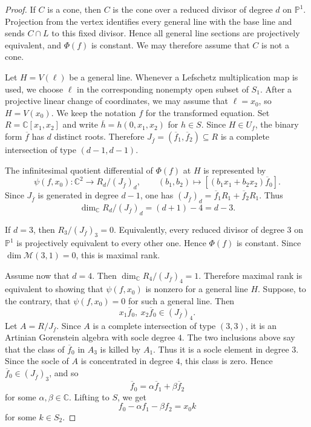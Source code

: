 \documentclass[11pt]{amsart}
\theoremstyle{plain}
\theoremstyle{definition}
\numberwithin{equation}{section}
\newcommand{\M}{{\mathcal M}}
\newcommand{\C}{\mathbb{C}}
\newcommand{\PP}{\mathbb{P}}
\begin{document}
\begin{proof}
If $C$ is a cone, then $C$ is the cone over a reduced divisor of degree $d$ on
$\PP^1$. Projection from the vertex identifies every general line with the base
line and sends $C\cap L$ to this fixed divisor. Hence all general line sections
are projectively equivalent, and $\Phi(f)$ is constant. We may therefore assume
that $C$ is not a cone.

Let $H=V(\ell)$ be a general line. Whenever a Lefschetz multiplication map is
used, we choose $\ell$ in the corresponding nonempty open subset of $S_1$. After
a projective linear change of coordinates, we may assume that $\ell=x_0$, so
$H=V(x_0)$. We keep the notation $f$ for the transformed equation. Set
$R=\C[x_1,x_2]$ and write $\overline h=h(0,x_1,x_2)$ for $h\in S$. Since
$H\in U_f$, the binary form $\overline f$ has $d$ distinct roots. Therefore
$J_{\overline f}=(\overline f_1,\overline f_2)\subseteq R$ is a complete
intersection of type $(d-1,d-1)$.

The infinitesimal quotient differential of $\Phi(f)$ at $H$ is represented by
\[
\psi(f,x_0):\C^2\to R_d/(J_{\overline f})_d,\qquad
(b_1,b_2)\mapsto [(b_1x_1+b_2x_2)\overline f_0].
\]
Since $J_{\overline f}$ is generated in degree $d-1$, one has
$(J_{\overline f})_d=\overline f_1R_1+\overline f_2R_1$. Thus
\[
\dim_\C R_d/(J_{\overline f})_d=(d+1)-4=d-3.
\]

If $d=3$, then $R_3/(J_{\overline f})_3=0$. Equivalently, every reduced divisor
of degree $3$ on $\PP^1$ is projectively equivalent to every other one. Hence
$\Phi(f)$ is constant. Since $\dim\M(3,1)=0$, this is maximal rank.

Assume now that $d=4$. Then $\dim_\C R_4/(J_{\overline f})_4=1$. Therefore
maximal rank is equivalent to showing that $\psi(f,x_0)$ is nonzero for a
general line $H$. Suppose, to the contrary, that $\psi(f,x_0)=0$ for such a
general line. Then
\[
x_1\overline f_0,\ x_2\overline f_0\in (J_{\overline f})_4.
\]
Let $A=R/J_{\overline f}$. Since $A$ is a complete intersection of type $(3,3)$,
it is an Artinian Gorenstein algebra with socle degree $4$. The two inclusions
above say that the class of $\overline f_0$ in $A_3$ is killed by $A_1$. Thus it
is a socle element in degree $3$. Since the socle of $A$ is concentrated in
degree $4$, this class is zero. Hence $\overline f_0\in (J_{\overline f})_3$,
and so
\[
\overline f_0=\alpha\overline f_1+\beta\overline f_2
\]
for some $\alpha,\beta\in\C$. Lifting to $S$, we get
\[
f_0-\alpha f_1-\beta f_2=x_0k
\]
for some $k\in S_2$.


\end{proof}
\end{document}
